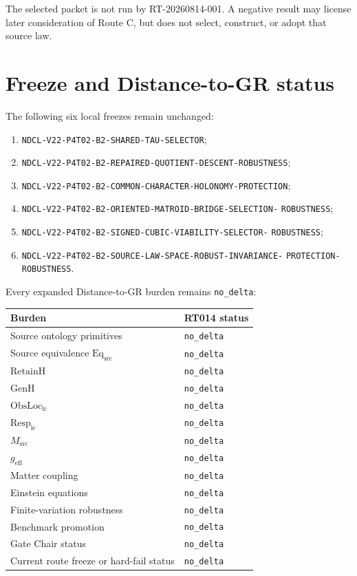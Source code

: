 \documentclass[11pt]{article}
\newcommand{\EqSrc}{\ensuremath{\mathrm{Eq}_{\mathrm{src}}}}
\newcommand{\NoDelta}{\texttt{no\_delta}}
\begin{document}
The selected packet is not run by RT-20260814-001.  A negative result may
license later consideration of Route C, but does not select, construct, or
adopt that source law.

\section{Freeze and Distance-to-GR status}

The following six local freezes remain unchanged:
\begin{enumerate}[leftmargin=2em]
  \item \texttt{NDCL-V22-P4T02-B2-SHARED-TAU-SELECTOR};
  \item \texttt{NDCL-V22-P4T02-B2-REPAIRED-QUOTIENT-DESCENT-ROBUSTNESS};
  \item \texttt{NDCL-V22-P4T02-B2-COMMON-CHARACTER-HOLONOMY-PROTECTION};
  \item \texttt{NDCL-V22-P4T02-B2-ORIENTED-MATROID-BRIDGE-SELECTION-}
        \texttt{ROBUSTNESS};
  \item \texttt{NDCL-V22-P4T02-B2-SIGNED-CUBIC-VIABILITY-SELECTOR-}
        \texttt{ROBUSTNESS};
  \item \texttt{NDCL-V22-P4T02-B2-SOURCE-LAW-SPACE-ROBUST-INVARIANCE-}
        \texttt{PROTECTION-ROBUSTNESS}.
\end{enumerate}

Every expanded Distance-to-GR burden remains \NoDelta{}:
\begin{center}
\small
\begin{tabular}{ll}
\toprule
Burden & RT014 status \\
\midrule
Source ontology primitives & \NoDelta{} \\
Source equivalence $\EqSrc$ & \NoDelta{} \\
$\mathrm{RetainH}$ & \NoDelta{} \\
$\mathrm{GenH}$ & \NoDelta{} \\
$\mathrm{ObsLoc}_{\mathrm{lc}}$ & \NoDelta{} \\
$\mathrm{Resp}_{\mathrm{lc}}$ & \NoDelta{} \\
$M_{\mathrm{src}}$ & \NoDelta{} \\
$g_{\mathrm{eff}}$ & \NoDelta{} \\
Matter coupling & \NoDelta{} \\
Einstein equations & \NoDelta{} \\
Finite-variation robustness & \NoDelta{} \\
Benchmark promotion & \NoDelta{} \\
Gate Chair status & \NoDelta{} \\
Current route freeze or hard-fail status & \NoDelta{} \\
\bottomrule
\end{tabular}
\end{center}
\end{document}
